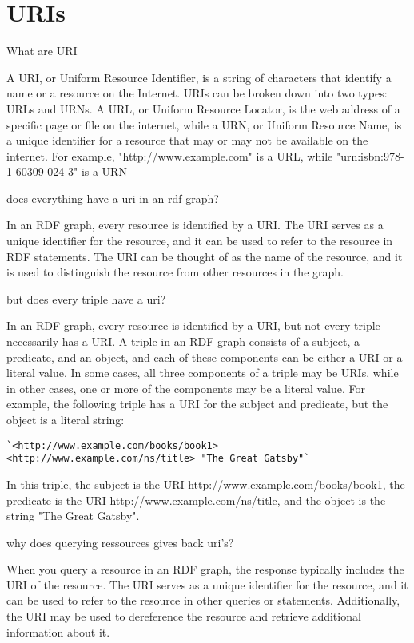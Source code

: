 \section*{URIs}
\begin{description}
	\me What are URI

	\gpt A URI, or Uniform Resource Identifier, is a string of characters that identify a name or a resource on the Internet. URIs can be broken down into two types: URLs and URNs. A URL, or Uniform Resource Locator, is the web address of a specific page or file on the internet, while a URN, or Uniform Resource Name, is a unique identifier for a resource that may or may not be available on the internet. For example, "http://www.example.com" is a URL, while "urn:isbn:978-1-60309-024-3" is a URN

	\me does everything have a uri in an rdf graph?

	\gpt In an RDF graph, every resource is identified by a URI. The URI serves as a unique identifier for the resource, and it can be used to refer to the resource in RDF statements. The URI can be thought of as the name of the resource, and it is used to distinguish the resource from other resources in the graph.

	\me but does every triple have a uri?

	\gpt In an RDF graph, every resource is identified by a URI, but not every triple necessarily has a URI. A triple in an RDF graph consists of a subject, a predicate, and an object, and each of these components can be either a URI or a literal value. In some cases, all three components of a triple may be URIs, while in other cases, one or more of the components may be a literal value. For example, the following triple has a URI for the subject and predicate, but the object is a literal string:

	\begin{lstlisting}[language=SPARQL]
`<http://www.example.com/books/book1> <http://www.example.com/ns/title> "The Great Gatsby"`	
\end{lstlisting}

	In this triple, the subject is the URI http://www.example.com/books/book1, the predicate is the URI http://www.example.com/ns/title, and the object is the string "The Great Gatsby".

	\me why does querying ressources gives back uri's?

	\gpt When you query a resource in an RDF graph, the response typically includes the URI of the resource. The URI serves as a unique identifier for the resource, and it can be used to refer to the resource in other queries or statements. Additionally, the URI may be used to dereference the resource and retrieve additional information about it.


\end{description}
